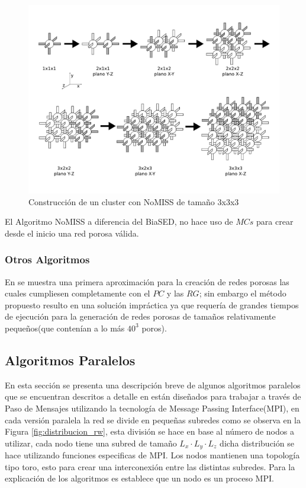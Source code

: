 \begin{figure}[hbtp]
\centering
\includegraphics[width=5.0in]{img/cluster-nomiss_es.pdf}
\caption{Construcción de un cluster con NoMISS de tamaño 3x3x3}
\label{fig:cluster_nomiss}
\end{figure}

El Algoritmo NoMISS a diferencia del BiaSED, no hace uso de $MCs$ para crear desde el inicio una red porosa válida.\\

\subsubsection{Otros Algoritmos}
En \cite{ref5} se muestra una primera aproximación para la creación de redes porosas las cuales cumpliesen completamente con el $PC$ y las $RG$; sin embargo el método propuesto resulto en una solución impráctica ya que requería de grandes tiempos de ejecución para la generación de redes porosas de tamaños relativamente pequeños(que contenían a lo más $40^3$ poros).


\subsection{Algoritmos Paralelos}
\label{subsec:algspar}
En esta sección se presenta una descripción breve de algunos algoritmos paralelos que se encuentran descritos a detalle en \cite{ref4} están diseñados para trabajar a través de Paso de Mensajes utilizando la tecnología de Message Passing Interface(MPI), en cada versión paralela la red se divide en pequeñas subredes como se observa en la Figura \ref{fig:distribucion_rw}, esta división se hace en base al número de nodos a utilizar, cada nodo tiene una subred de tamaño $L_x \cdot L_y \cdot L_z$ dicha distribución se hace utilizando funciones especificas de MPI. Los nodos mantienen una topología tipo toro, esto para crear una interconexión entre las distintas subredes. Para la explicación de los algoritmos es establece que un nodo es un proceso MPI.

